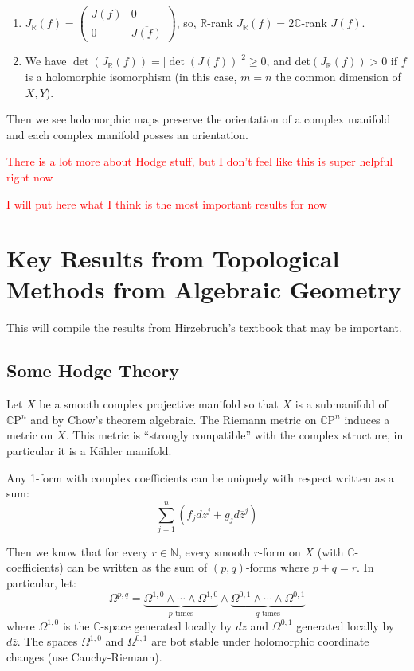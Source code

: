 \documentclass{book}
\newcommand{\C}{{\mathbb{C}}}
\newcommand{\N}{{\mathbb{N}}}
\newcommand{\CP}{\mathbb{C}\mathrm{P}}
\begin{document}
\begin{enumerate}
  \item  $J_\mathbb{R}(f) = \begin{pmatrix}J(f) & 0 \\
    0 & \overline{J(f)}\end{pmatrix}$, so, $\mathbb{R}$-rank $J_\mathbb{R}(f) = 2\mathbb{C}$-rank $J(f)$.

  \item  We have $\det(J_\mathbb{R}(f)) = |\det(J(f))|^2 \geq 0$, and det$(J_\mathbb{R}(f)) > 0$ if $f$ is a holomorphic isomorphism (in this case, $m=n$ the common dimension of $X,Y$).
\end{enumerate}

Then we see holomorphic maps preserve the orientation of a complex manifold and each complex manifold posses
an orientation.

\textcolor{red}{There is a lot more about Hodge stuff, but I don't feel like this is super helpful right now}

\textcolor{red}{I will put here what I think is the most important results for now}


\chapter{Key Results from Topological Methods from Algebraic Geometry}


This will compile the results from Hirzebruch's textbook that may be important.


\section{Some Hodge Theory}



Let $X$ be a smooth complex projective manifold so that $X$ is a submanifold of $\CP^n$ and by Chow's
theorem algebraic. The Riemann metric on $\CP^n$ induces a metric on $X$. This metric is ``strongly
compatible'' with the complex structure, in particular it is a K\"ahler manifold.

Any 1-form with complex coefficients can be uniquely with respect written as a sum:
\[
  \sum_{j=1}^n (f_jdz^{j} + g_jd\overline{z}^j)
\]

Then we know that for every $r \in \N$, every smooth $r$-form on $X$ (with $\C$-coefficients) can be written
as the sum of $(p,q)$-forms where $p+q = r$.
In particular, let:
\[
  \Omega^{p,q} = \underbrace{\Omega^{1,0} \wedge \cdots \wedge \Omega^{1,0}}_{\text{$p$ times}}\wedge \underbrace{\Omega^{0,1} \wedge \cdots \wedge \Omega^{0,1}}_{\text{$q$ times}}
\]
where $\Omega^{1,0}$ is the $\C$-space generated locally by $dz$ and $\Omega^{0,1}$ generated locally by
$d\overline{z}$. The spaces $\Omega^{1,0}$ and $\Omega^{0,1}$ are bot stable under holomorphic coordinate
changes (use Cauchy-Riemann).
\end{document}
